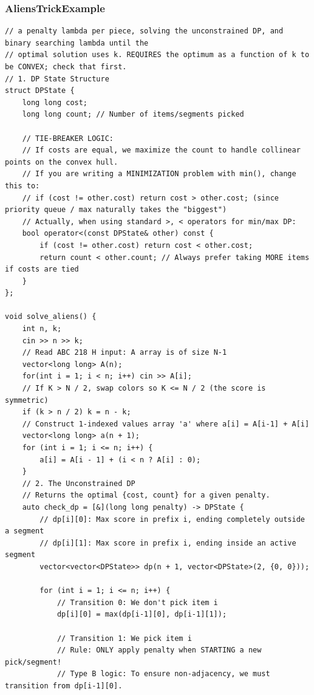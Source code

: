 \documentclass[9pt,a4paper,twocolumn]{extarticle}
\begin{document}
\filbreak
\subsubsection{AliensTrickExample}
\nopagebreak
\begin{lstlisting}
// a penalty lambda per piece, solving the unconstrained DP, and binary searching lambda until the
// optimal solution uses k. REQUIRES the optimum as a function of k to be CONVEX; check that first.
// 1. DP State Structure
struct DPState {
    long long cost;
    long long count; // Number of items/segments picked

    // TIE-BREAKER LOGIC:
    // If costs are equal, we maximize the count to handle collinear points on the convex hull.
    // If you are writing a MINIMIZATION problem with min(), change this to:
    // if (cost != other.cost) return cost > other.cost; (since priority queue / max naturally takes the "biggest")
    // Actually, when using standard >, < operators for min/max DP:
    bool operator<(const DPState& other) const {
        if (cost != other.cost) return cost < other.cost;
        return count < other.count; // Always prefer taking MORE items if costs are tied
    }
};

void solve_aliens() {
    int n, k;
    cin >> n >> k;
    // Read ABC 218 H input: A array is of size N-1
    vector<long long> A(n);
    for(int i = 1; i < n; i++) cin >> A[i];
    // If K > N / 2, swap colors so K <= N / 2 (the score is symmetric)
    if (k > n / 2) k = n - k;
    // Construct 1-indexed values array 'a' where a[i] = A[i-1] + A[i]
    vector<long long> a(n + 1);
    for (int i = 1; i <= n; i++) {
        a[i] = A[i - 1] + (i < n ? A[i] : 0);
    }
    // 2. The Unconstrained DP
    // Returns the optimal {cost, count} for a given penalty.
    auto check_dp = [&](long long penalty) -> DPState {
        // dp[i][0]: Max score in prefix i, ending completely outside a segment
        // dp[i][1]: Max score in prefix i, ending inside an active segment
        vector<vector<DPState>> dp(n + 1, vector<DPState>(2, {0, 0}));

        for (int i = 1; i <= n; i++) {
            // Transition 0: We don't pick item i
            dp[i][0] = max(dp[i-1][0], dp[i-1][1]);

            // Transition 1: We pick item i
            // Rule: ONLY apply penalty when STARTING a new pick/segment!
            // Type B logic: To ensure non-adjacency, we must transition from dp[i-1][0].


\end{lstlisting}
\end{document}
